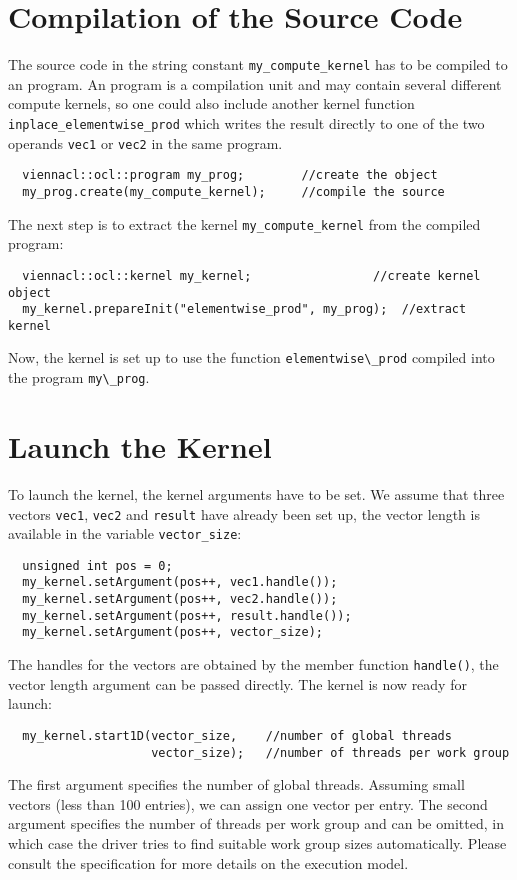 \section{Compilation of the Source Code}
The source code in the string constant \lstinline{my_compute_kernel} has to be compiled to an {\OpenCL} program. An {\OpenCL} program is a compilation unit and may contain several different compute kernels, so one could also include another kernel function \lstinline{inplace_elementwise_prod} which writes the result directly to one of the two operands \lstinline{vec1} or \lstinline{vec2} in the same program.
\begin{lstlisting}
  viennacl::ocl::program my_prog;        //create the object
  my_prog.create(my_compute_kernel);     //compile the source
\end{lstlisting}
The next step is to extract the kernel \lstinline|my_compute_kernel| from the compiled program:
\begin{lstlisting}
  viennacl::ocl::kernel my_kernel;                 //create kernel object
  my_kernel.prepareInit("elementwise_prod", my_prog);  //extract kernel
\end{lstlisting}
Now, the kernel is set up to use the function \lstinline|elementwise\_prod| compiled into the program \lstinline|my\_prog|.



\section{Launch the Kernel}
To launch the kernel, the kernel arguments have to be set. We assume that three {\ViennaCL} vectors \lstinline|vec1|, \lstinline|vec2| and \lstinline|result| have already been set up, the vector length is available in the variable \lstinline|vector_size|:
\begin{lstlisting}
  unsigned int pos = 0;
  my_kernel.setArgument(pos++, vec1.handle());
  my_kernel.setArgument(pos++, vec2.handle());
  my_kernel.setArgument(pos++, result.handle());
  my_kernel.setArgument(pos++, vector_size);
\end{lstlisting}
The {\OpenCL} handles for the vectors are obtained by the member function \lstinline{handle()}, the vector length argument can be passed directly. The kernel is now ready for launch:
\begin{lstlisting}
  my_kernel.start1D(vector_size,    //number of global threads
                    vector_size);   //number of threads per work group
\end{lstlisting}
The first argument specifies the number of global threads. Assuming small vectors (less than 100 entries), we can assign one vector per entry. The second argument specifies the number of threads per work group and can be omitted, in which case the {\OpenCL} driver tries to find suitable work group sizes automatically. Please consult the {\OpenCL} specification \cite{khronoscl} for more details on the execution model.

